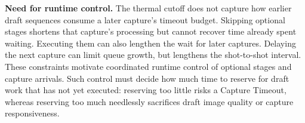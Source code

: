 \smallskip\noindent\textbf{Need for runtime control.}
The thermal cutoff does not capture how earlier draft sequences consume a later capture's timeout budget.
Skipping optional stages shortens that capture's processing but cannot recover time already spent waiting.
Executing them can also lengthen the wait for later captures.
Delaying the next capture can limit queue growth, but lengthens the shot-to-shot interval.
These constraints motivate coordinated runtime control of optional stages and capture arrivals.
Such control must decide how much time to reserve for draft work that has not yet executed: reserving too little risks a Capture Timeout, whereas reserving too much needlessly sacrifices draft image quality or capture responsiveness.
